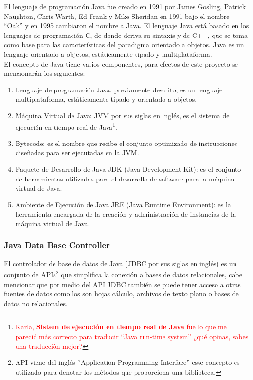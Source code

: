 El lenguaje de programación Java fue creado en 1991 por James Gosling, Patrick Naughton, Chris Warth, Ed Frank y Mike Sheridan en 1991 bajo el nombre ``Oak'' y en 1995 cambiaron el nombre a Java. El lenguaje Java está basado en los lenguajes de programación C, de donde deriva su sintaxis y de C++, que se toma como base para las características del paradigma orientado a objetos. Java es un lenguaje orientado a objetos, estáticamente tipado y multiplataforma\cite{JavaCompleteReference, WellGroundedJavaDeveloper}.\\
El concepto de Java tiene varios componentes, para efectos de este proyecto se mencionarán los siguientes\cite{JavaCompleteReference, WellGroundedJavaDeveloper}:
\begin{enumerate}
	\item Lenguaje de programación Java: previamente descrito, es un lenguaje multiplataforma, estáticamente tipado y orientado a objetos.
	\item Máquina Virtual de Java: JVM por sus siglas en inglés, es el sistema de ejecución en tiempo real de Java\footnote{\textcolor{red}{Karla, \textbf{Sistem de ejecución en tiempo real de Java} fue lo que me pareció más correcto para traducir ``Java run-time system'' ¿qué opinas, sabes una traducción mejor?}}.
	\item Bytecode: es el nombre que recibe el conjunto optimizado de instrucciones diseñadas para ser ejecutadas en la JVM.
	\item Paquete de Desarrollo de Java JDK (Java Development Kit): es el conjunto de herramientas utilizadas para el desarrollo de software para la máquina virtual de Java.
	\item Ambiente de Ejecución de Java JRE (Java Runtime Environment): es la herramienta encargada de la creación y administración de instancias de la máquina virtual de Java.
\end{enumerate}

\subsubsection{Java Data Base Controller}\label{sec-jdbc}
El controlador de base de datos de Java (JDBC por sus siglas en inglés) es un conjunto de APIs\footnote{API viene del inglés ``Application Programming Interface'' este concepto es utilizado para denotar los métodos que proporciona una biblioteca.} que simplifica la conexión a bases de datos relacionales, cabe mencionar que por medio del API JDBC también se puede tener acceso a otras fuentes de datos como los son hojas cálculo, archivos de texto plano o bases de datos no relacionales\cite{JDBCRecipes, BeginingJava8APIs}.

